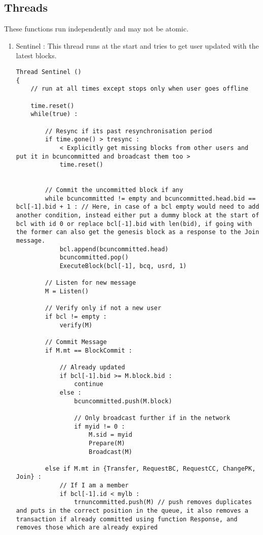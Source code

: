\subsection{Threads}
These functions run independently and may not be atomic.
\begin{enumerate}
    \item Sentinel : This thread runs at the start and tries to get user updated with the latest blocks.
\begin{lstlisting}
Thread Sentinel ()
{
    // run at all times except stops only when user goes offline

    time.reset()
    while(true) :
        
        // Resync if its past resynchronisation period
        if time.gone() > tresync :
            < Explicitly get missing blocks from other users and put it in bcuncommitted and broadcast them too >
            time.reset()

        
        // Commit the uncommitted block if any
        while bcuncommitted != empty and bcuncommitted.head.bid == bcl[-1].bid + 1 : // Here, in case of a bcl empty would need to add another condition, instead either put a dummy block at the start of bcl with id 0 or replace bcl[-1].bid with len(bid), if going with the former can also get the genesis block as a response to the Join message.
            bcl.append(bcuncommitted.head)
            bcuncommitted.pop()
            ExecuteBlock(bcl[-1], bcq, usrd, 1)
        
        // Listen for new message
        M = Listen() 

        // Verify only if not a new user
        if bcl != empty :
            verify(M)

        // Commit Message
        if M.mt == BlockCommit :
            
            // Already updated
            if bcl[-1].bid >= M.block.bid :
                continue
            else :
                bcuncommitted.push(M.block)

                // Only broadcast further if in the network
                if myid != 0 :
                    M.sid = myid
                    Prepare(M)
                    Broadcast(M)

        else if M.mt in {Transfer, RequestBC, RequestCC, ChangePK, Join} :
            // If I am a member
            if bcl[-1].id < mylb :
                trnuncommitted.push(M) // push removes duplicates and puts in the correct position in the queue, it also removes a transaction if already committed using function Response, and removes those which are already expired


\end{lstlisting}
\end{enumerate}

